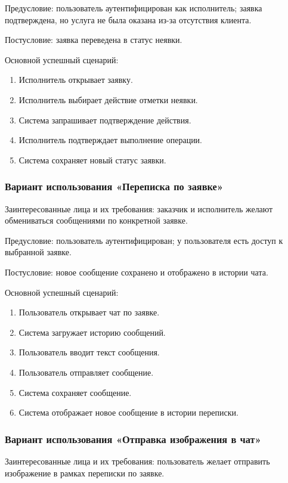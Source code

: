 Предусловие: пользователь аутентифицирован как исполнитель; заявка подтверждена, но услуга не была оказана из-за отсутствия клиента.

Постусловие: заявка переведена в статус неявки.

Основной успешный сценарий:
\begin{enumerate}
	\item Исполнитель открывает заявку.
	\item Исполнитель выбирает действие отметки неявки.
	\item Система запрашивает подтверждение действия.
	\item Исполнитель подтверждает выполнение операции.
	\item Система сохраняет новый статус заявки.
\end{enumerate}

\subsubsection{Вариант использования «Переписка по заявке»}

Заинтересованные лица и их требования: заказчик и исполнитель желают обмениваться сообщениями по конкретной заявке.

Предусловие: пользователь аутентифицирован; у пользователя есть доступ к выбранной заявке.

Постусловие: новое сообщение сохранено и отображено в истории чата.

Основной успешный сценарий:
\begin{enumerate}
	\item Пользователь открывает чат по заявке.
	\item Система загружает историю сообщений.
	\item Пользователь вводит текст сообщения.
	\item Пользователь отправляет сообщение.
	\item Система сохраняет сообщение.
	\item Система отображает новое сообщение в истории переписки.
\end{enumerate}

\subsubsection{Вариант использования «Отправка изображения в чат»}

Заинтересованные лица и их требования: пользователь желает отправить изображение в рамках переписки по заявке.

